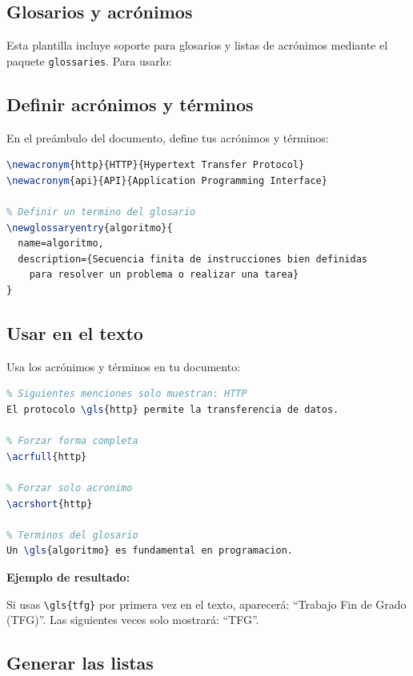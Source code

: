 \documentclass[a4paper,11pt]{report}
\begin{document}
\begin{appendices}
\section{Glosarios y acrónimos}

Esta plantilla incluye soporte para glosarios y listas de acrónimos mediante el paquete \texttt{glossaries}. Para usarlo:

\subsection{Definir acrónimos y términos}

En el preámbulo del documento, define tus acrónimos y términos:

\begin{lstlisting}[language=TeX, caption={Definición de acrónimos y glosario}]
% Definir un acronimo
\newacronym{http}{HTTP}{Hypertext Transfer Protocol}
\newacronym{api}{API}{Application Programming Interface}

% Definir un termino del glosario
\newglossaryentry{algoritmo}{
  name=algoritmo,
  description={Secuencia finita de instrucciones bien definidas 
    para resolver un problema o realizar una tarea}
}
\end{lstlisting}

\subsection{Usar en el texto}

Usa los acrónimos y términos en tu documento:

\begin{lstlisting}[language=TeX, caption={Uso de acrónimos y glosario en el texto}]
% Primera mencion muestra completo: HTTP (HyperText Transfer Protocol)
% Siguientes menciones solo muestran: HTTP
El protocolo \gls{http} permite la transferencia de datos.

% Forzar forma completa
\acrfull{http}

% Forzar solo acronimo
\acrshort{http}

% Terminos del glosario
Un \gls{algoritmo} es fundamental en programacion.
\end{lstlisting}

\textbf{Ejemplo de resultado:}

Si usas \texttt{\textbackslash gls\{tfg\}} por primera vez en el texto, aparecerá: ``Trabajo Fin de Grado (TFG)''. Las siguientes veces solo mostrará: ``TFG''.

\subsection{Generar las listas}


\end{appendices}
\end{document}
